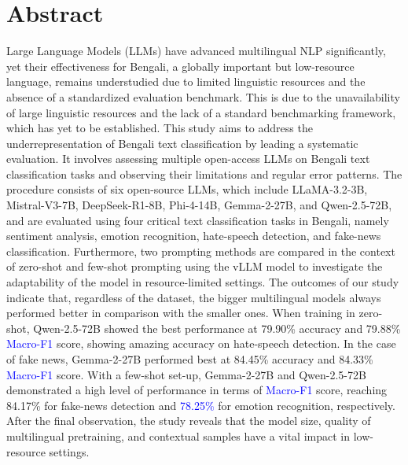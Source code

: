 \documentclass[10pt,letterpaper]{article}
\newcommand{\rev}[1]{\textcolor{blue}{#1}}
\begin{document}
\section*{Abstract}
Large Language Models (LLMs) have advanced multilingual NLP significantly, yet their effectiveness for Bengali, a globally important but low-resource language, remains understudied due to limited linguistic resources and the absence of a standardized evaluation benchmark. This is due to the unavailability of large linguistic resources and the lack of a standard benchmarking framework, which has yet to be established. This study aims to address the underrepresentation of Bengali text classification by leading a systematic evaluation. It involves assessing multiple open-access LLMs on Bengali text classification tasks and observing their limitations and regular error patterns. The procedure consists of six open-source LLMs, which include LLaMA-3.2-3B, Mistral-V3-7B, DeepSeek-R1-8B, Phi-4-14B, Gemma-2-27B, and Qwen-2.5-72B, and are evaluated using four critical text classification tasks in Bengali, namely sentiment analysis, emotion recognition, hate-speech detection, and fake-news classification. Furthermore, two prompting methods are compared in the context of zero-shot and few-shot prompting using the vLLM model to investigate the adaptability of the model in resource-limited settings. The outcomes of our study indicate that, regardless of the dataset, the bigger multilingual models always performed better in comparison with the smaller ones. When training in zero-shot, Qwen-2.5-72B showed the best performance at 79.90\% accuracy and 79.88\% \rev{Macro-F1} score, showing amazing accuracy on hate-speech detection. In the case of fake news, Gemma-2-27B performed best at 84.45\% accuracy and 84.33\% \rev{Macro-F1} score. With a few-shot set-up, Gemma-2-27B and Qwen-2.5-72B demonstrated a high level of performance in terms of \rev{Macro-F1} score, reaching 84.17\% for fake-news detection and \rev{78.25\%} for emotion recognition, respectively. After the final observation, the study reveals that the model size, quality of multilingual pretraining, and contextual samples have a vital impact in low-resource settings.


\end{document}
